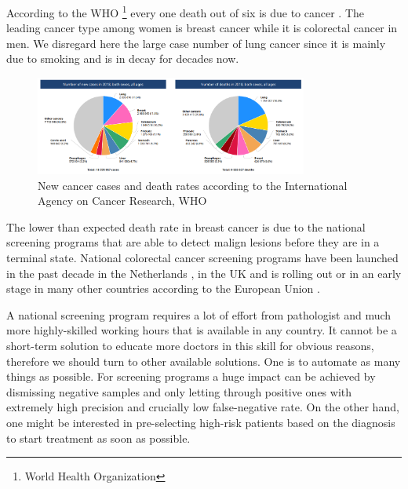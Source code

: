 \documentclass[a4paper,12pt]{article}
\begin{document}
\vspace{4mm}

\par According to the WHO \footnote{World Health Organization} every one death out of six is due to cancer \cite{whoCANCER}. The leading cancer type among women is breast cancer while it is colorectal cancer in men. We disregard here the large case number of lung cancer since it is mainly due to smoking and is in decay for decades now.

\vspace{4mm}

\begin{figure}[H]
    \centering
    \includegraphics[width=0.8\textwidth]{all_cancer_pie_charts.png}
    \caption{New cancer cases and death rates according to the International Agency on Cancer Research,  WHO}
    \label{fig:cancer_pie_chart}
\end{figure}

\vspace{4mm}

\par The lower than expected death rate in breast cancer is due to the national screening programs that are able to detect malign lesions before they are in a terminal state. National colorectal cancer screening programs have been launched in the past decade in the Netherlands \cite{rivm_2014}, in the UK \cite{gov.uk_2015} and is rolling out or in an early stage in many other countries according to the European Union \cite{euReportOnCancer}.

\vspace{4mm}

\par A national screening program requires a lot of effort from pathologist and much more highly-skilled working hours that is available in any country. It cannot be a short-term solution to educate more doctors in this skill for obvious reasons, therefore we should turn to other available solutions. One is to automate as many things as possible. For screening programs a huge impact can be achieved by dismissing negative samples and only letting through positive ones with extremely high precision and crucially low false-negative rate. On the other hand, one might be interested in pre-selecting high-risk patients based on the diagnosis to start treatment as soon as possible.
\end{document}
